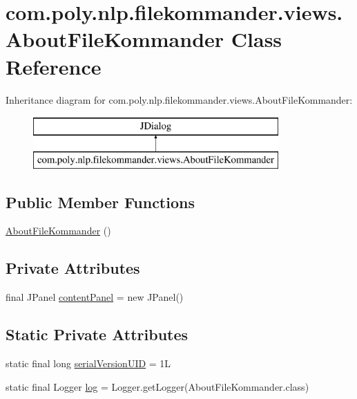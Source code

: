 \hypertarget{classcom_1_1poly_1_1nlp_1_1filekommander_1_1views_1_1_about_file_kommander}{\section{com.\-poly.\-nlp.\-filekommander.\-views.\-About\-File\-Kommander Class Reference}
\label{classcom_1_1poly_1_1nlp_1_1filekommander_1_1views_1_1_about_file_kommander}
}
Inheritance diagram for com.\-poly.\-nlp.\-filekommander.\-views.\-About\-File\-Kommander\-:\begin{figure}[H]
\begin{center}
\leavevmode
\includegraphics[height=2.000000cm]{classcom_1_1poly_1_1nlp_1_1filekommander_1_1views_1_1_about_file_kommander}
\end{center}
\end{figure}
\subsection*{Public Member Functions}
\begin{DoxyCompactItemize}
\item 
\hyperlink{classcom_1_1poly_1_1nlp_1_1filekommander_1_1views_1_1_about_file_kommander_a6c6d915be3b14f24908a482834ad6b7a}{About\-File\-Kommander} ()
\end{DoxyCompactItemize}
\subsection*{Private Attributes}
\begin{DoxyCompactItemize}
\item 
final J\-Panel \hyperlink{classcom_1_1poly_1_1nlp_1_1filekommander_1_1views_1_1_about_file_kommander_ad925c308e870c6d3789d72cdec139c93}{content\-Panel} = new J\-Panel()
\end{DoxyCompactItemize}
\subsection*{Static Private Attributes}
\begin{DoxyCompactItemize}
\item 
static final long \hyperlink{classcom_1_1poly_1_1nlp_1_1filekommander_1_1views_1_1_about_file_kommander_a3d338ec3ae32777a71f45c76b80cb59d}{serial\-Version\-U\-I\-D} = 1\-L
\item 
static final Logger \hyperlink{classcom_1_1poly_1_1nlp_1_1filekommander_1_1views_1_1_about_file_kommander_af5cbf6e6423901be93a2a580049f3728}{log} = Logger.\-get\-Logger(About\-File\-Kommander.\-class)
\end{DoxyCompactItemize}


